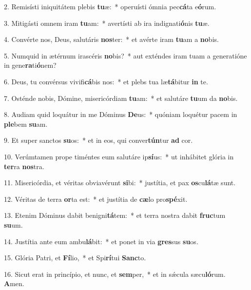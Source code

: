2. Remisísti iniquitátem plebis \textbf{tu}æ:~*  operuísti ómnia pec\textbf{cá}ta e\textbf{ó}rum.\

3. Mitigásti omnem iram \textbf{tu}am:~*  avertísti ab ira indignati\textbf{ó}nis \textbf{tu}æ.\

4. Convérte nos, Deus, salutáris \textbf{nos}ter:~*  et avérte iram \textbf{tu}am a \textbf{no}bis.\

5. Numquid in ætérnum irascéris \textbf{no}bis?~*  aut exténdes iram tuam a generatióne in gene\textbf{ra}ti\textbf{ó}nem?\

6. Deus, tu convérsus vivifi\textbf{cá}bis nos:~*  et plebs tua læ\textbf{tá}bitur \textbf{in} te.\

7. Osténde nobis, Dómine, misericórdiam \textbf{tu}am:~*  et salutáre \textbf{tu}um da \textbf{no}bis.\

8. Audiam quid loquátur in me Dóminus \textbf{De}us:~*  quóniam loquétur pacem in \textbf{ple}bem \textbf{su}am.\

9. Et super sanctos \textbf{su}os:~*  et in eos, qui conver\textbf{tún}tur \textbf{ad} cor.\

10. Verúmtamen prope timéntes eum salutáre ip\textbf{sí}us:~*  ut inhábitet glória in \textbf{ter}ra \textbf{nos}tra.\

11. Misericórdia, et véritas obviavérunt \textbf{si}bi:~*  justítia, et pax \textbf{os}cu\textbf{lá}tæ sunt.\

12. Véritas de terra \textbf{or}ta est:~*  et justítia de \textbf{cæ}lo pro\textbf{spé}xit.\

13. Etenim Dóminus dabit benigni\textbf{tá}tem:~*  et terra nostra dabit \textbf{fruc}tum \textbf{su}um.\

14. Justítia ante eum ambu\textbf{lá}bit:~*  et ponet in via \textbf{gres}sus \textbf{su}os.\

15. Glória Patri, et \textbf{Fí}lio,~*  et Spi\textbf{rí}tui \textbf{Sanc}to.\

16. Sicut erat in princípio, et nunc, et \textbf{sem}per,~*  et in sǽcula sæcu\textbf{ló}rum. \textbf{A}men.\

